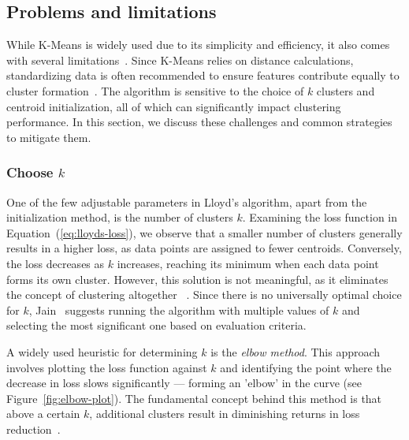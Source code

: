 \documentclass[10pt,twocolumn,letterpaper]{article}
\begin{document}

\subsection{Problems and limitations}\label{subsec:problems-and-limitations}

While K-Means is widely used due to its simplicity and efficiency, it also
comes with several limitations~\cite{Ezugwu2022104743,
    FRANTI201995,Jain2010651}. Since K-Means relies on distance calculations,
standardizing data is often recommended to ensure features contribute equally
to cluster formation~\cite{Morissette2013}. The algorithm is sensitive to the
choice of $k$ clusters and centroid initialization, all of which can
significantly impact clustering performance. In this section, we discuss these
challenges and common strategies to mitigate them.


\subsubsection{Choose $k$}

One of the few adjustable parameters in Lloyd's algorithm, apart from the
initialization method, is the number of clusters $k$. Examining the loss
function in Equation~(\ref{eq:lloyds-loss}), we observe that a smaller number
of clusters generally results in a higher loss, as data points are assigned to
fewer centroids. Conversely, the loss decreases as $k$ increases, reaching its
minimum when each data point forms its own cluster. However, this solution is
not meaningful, as it eliminates the concept of clustering altogether
~\cite{deuschle2019}. Since there is no universally optimal choice for $k$,
Jain~\cite{Jain2010651} suggests running the algorithm with multiple values of
$k$ and selecting the most significant one based on evaluation criteria.

A widely used heuristic for determining $k$ is the \textit{elbow method}. This
approach involves plotting the loss function against $k$ and identifying the
point where the decrease in loss slows significantly — forming an 'elbow' in
the curve (see Figure~\ref{fig:elbow-plot}). The fundamental concept behind
this method is that above a certain $k$, additional clusters result in
diminishing returns in loss reduction~\cite{deuschle2019}.
\end{document}
